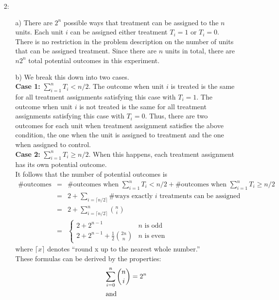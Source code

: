 \documentclass{article}
\begin{document}
\begin{itemize}
  \item[2:]  
  \begin{itemize}
  \item[a)]
    There are $2^n$ possible ways that treatment can be assigned to the $n$ units.
    Each unit $i$ can be assigned either treatment $T_i = 1$ or $T_i = 0$.
    There is no restriction in the problem description on the number of units that can be assigned treatment.
    Since there are $n$ units in total, there are $n2^n$ total potential outcomes in this experiment.
  \item[b)]
    We break this down into two cases.\\
    \textbf{Case 1:} $\sum_{i=1}^n T_i < n/2$.  
    The outcome when unit $i$ is treated is the same for all treatment assignments satisfying this case with $T_i = 1$.
    The outcome when unit $i$ is not treated is the same for all treatment assignments satisfying this case with $T_i = 0$.
    Thus, there are two outcomes for each unit when treatment assignment satisfies the above condition,
    the one when the unit is assigned to treatment and the one when assigned to control.\\
     \textbf{Case 2:} $\sum_{i=1}^n T_i \geq n/2$.  
    When this happens, each treatment assignment has its own potential outcome. \\
    It follows that the number of potential outcomes is
    \begin{eqnarray*}
      \#\text{outcomes} &=& \#\text{outcomes when }  \sum_{i=1}^n T_i < n/2 +  \#\text{outcomes when } \sum_{i=1}^n T_i \geq n/2\\
     & = & 2 + \sum_{i = \lceil n/2 \rceil}\#\text{ways exactly $i$ treatments can be assigned}  \\
     &= & 2 + \sum_{i = \lceil n/2 \rceil}^n \binom{n}{i}\\
     & = & \left\{
       \begin{array}{ll}
         2 + 2^{n-1} & n \text{ is odd}\\
         2 + 2^{n-1} + \frac 1 2\binom{2n}{n} & n \text{ is even}
       \end{array}
     \right.
    \end{eqnarray*}
    where $\lceil x \rceil$ denotes ``round x up to the nearest whole number.''\\
    These formulas can be derived by the properties:     
    \begin{align*}
       \sum_{i = 0}^n \binom n i &= 2^n \\ \intertext{and}

\end{align*}
\end{itemize}
\end{itemize}
\end{document}
